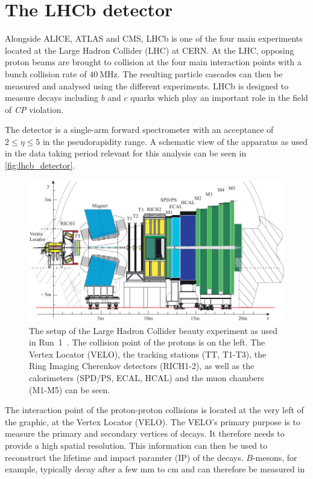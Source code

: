 \section{The LHCb detector}
\label{sec:Detector}
Alongside ALICE, ATLAS and CMS, LHCb is one of the four main experiments located at the Large Hadron Collider (LHC) at CERN. At the LHC, opposing proton beams are brought to
collision at the four main interaction points with a bunch collision rate of $\qty{40}{\mega\hertz}$. The resulting particle cascades can then be measured and analysed using the
different experiments. LHCb is designed to measure decays including $b$ and $c$ quarks which play an important role in the field of \textit{CP} violation. 

The detector is a single-arm forward spectrometer with an acceptance of $2 \leq \eta \leq 5$ in the pseudorapidity range. A schematic view of the apparatus as used in the data taking
period relevant for this analysis can be seen in \autoref{fig:lhcb_detector}.
\begin{figure}
    \centering
    \includegraphics[width = .8\textwidth]{"content/pics/LHCb-Detektor.pdf"}
    \caption{The setup of the Large Hadron Collider beauty experiment as used in Run~1~\cite{LHCb_detector}. 
    The collision point of the protons is on the left. The Vertex Locator (VELO),
    the tracking stations (TT, T1-T3), the Ring Imaging Cherenkov detectors (RICH1-2), as well as the calorimeters (SPD/PS, ECAL, HCAL) and the muon chambers (M1-M5) can be seen.}
    \label{fig:lhcb_detector}
\end{figure}
The interaction point of the proton-proton collisions is located at the very left of the graphic, at the Vertex Locator (VELO). The VELO's primary purpose is to 
measure the primary and secondary vertices of decays. It therefore needs to provide a high spatial resolution. This information can then be used to reconstruct the lifetime and
impact paramter (IP) of the decays. \mbox{$B$-mesons}, for example, typically decay after a few $\unit{\milli\metre}$ to $\unit{\centi\metre}$ and can therefore be measured in 
